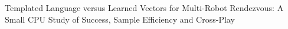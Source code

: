 Templated Language versus Learned Vectors for Multi-Robot Rendezvous: A Small CPU Study of Success, Sample Efficiency and Cross-Play
